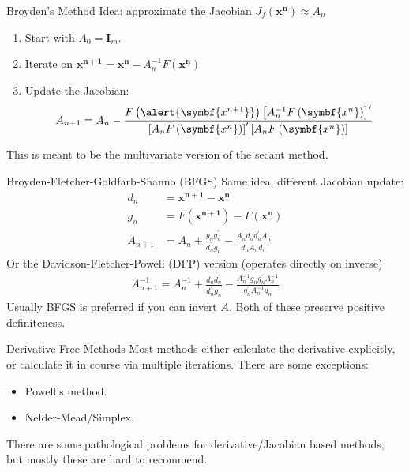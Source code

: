 \begin{frame}{Broyden's Method}
Idea: approximate the Jacobian $J_f(\symbf{x^n}) \approx A_n$
\begin{enumerate}
\item Start with $A_0 = \symbf{I}_m$.
\item Iterate on $\symbf{x^{n+1}}= \symbf{x^n} - A_n^{-1} F\left(\symbf{x^{n}}\right)$
\item Update the Jacobian:
\begin{align*}
A_{n+1}=A_{n}-\frac{F\left(\alert{\symbf{x^{n+1}}}\right)\left[A_{n}^{-1}  F\left(\symbf{x^{n}}\right) \right]^{\prime}}{\left[A_{n} F\left(\symbf{x^{n}}\right) \right]^{\prime}\left[A_{n} F\left(\symbf{x^{n}}\right) \right]}
\end{align*}
\end{enumerate}
This is meant to be the multivariate version of the \alert{secant method}.
\end{frame} 



\begin{frame}{Broyden-Fletcher-Goldfarb-Shanno (BFGS)}
Same idea, different Jacobian update:
\begin{align*}
d_n &= \symbf{x^{n+1}} - \symbf{x^n} \\
g_n &= F(\symbf{x^{n+1}}) -F(\symbf{x^n}) \\
A_{n+1}&=A_{n}+\frac{g_{n} g_{n}^{\prime}}{d_{n}^{\prime} g_{n}}-\frac{A_{n} d_{n} d_{n}^{\prime} A_{n}}{d_{n}^{\prime} A_{n} d_{n}}
\end{align*}
Or the Davidson-Fletcher-Powell (DFP) version (operates directly on inverse)
\begin{align*}
A_{n+1}^{-1}=A_{n}^{-1}+\frac{d_{n} d_{n}^{\prime}}{d_{n}^{\prime} g_{n}}-\frac{A_{n}^{-1} g_{n} g_{n}^{\prime} A_{n}^{-1}}{g_{n}^{\prime} A_{n}^{-1} g_{n}}
\end{align*}
Usually BFGS is preferred if you can invert $A$. Both of these preserve \alert{positive definiteness}.
\end{frame} 

\begin{frame}{Derivative Free Methods}
Most methods either calculate the derivative explicitly, or calculate it in course via multiple iterations. There are some exceptions:
\begin{itemize}
\item Powell's method.
\item Nelder-Mead/Simplex.
\end{itemize}
There are some pathological problems for derivative/Jacobian based methods, but mostly these are hard to recommend.
\end{frame} 


